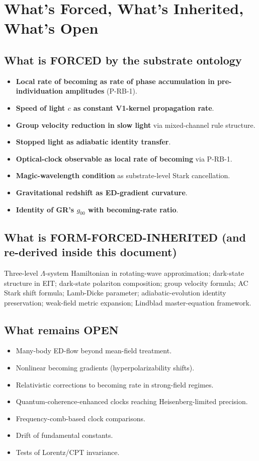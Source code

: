 \documentclass[11pt,a4paper]{article}
\begin{document}
\section{What's Forced, What's Inherited, What's Open}

\subsection*{What is FORCED by the substrate ontology}

\begin{itemize}[noitemsep]
  \item \textbf{Local rate of becoming as rate of phase accumulation in pre-individuation amplitudes} (P-RB-1).
  \item \textbf{Speed of light $c$ as constant V1-kernel propagation rate}.
  \item \textbf{Group velocity reduction in slow light} via mixed-channel rule structure.
  \item \textbf{Stopped light as adiabatic identity transfer}.
  \item \textbf{Optical-clock observable as local rate of becoming} via P-RB-1.
  \item \textbf{Magic-wavelength condition} as substrate-level Stark cancellation.
  \item \textbf{Gravitational redshift as ED-gradient curvature}.
  \item \textbf{Identity of GR's $g_{00}$ with becoming-rate ratio}.
\end{itemize}

\subsection*{What is FORM-FORCED-INHERITED (and re-derived inside this document)}

Three-level $\Lambda$-system Hamiltonian in rotating-wave approximation; dark-state structure in EIT; dark-state polariton composition; group velocity formula; AC Stark shift formula; Lamb-Dicke parameter; adiabatic-evolution identity preservation; weak-field metric expansion; Lindblad master-equation framework.

\subsection*{What remains OPEN}

\begin{itemize}[noitemsep]
  \item Many-body ED-flow beyond mean-field treatment.
  \item Nonlinear becoming gradients (hyperpolarizability shifts).
  \item Relativistic corrections to becoming rate in strong-field regimes.
  \item Quantum-coherence-enhanced clocks reaching Heisenberg-limited precision.
  \item Frequency-comb-based clock comparisons.
  \item Drift of fundamental constants.
  \item Tests of Lorentz/CPT invariance.
\end{itemize}
\end{document}
